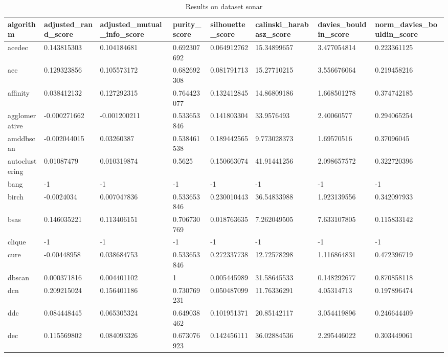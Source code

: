 \begin{table}[H]
\centering
\caption{Results on dataset sonar}
\label{S67_Table}
\begin{tabular}{|l|l|l|l|l|l|l|l|}
\hline
algorithm & adjusted\_rand\_score & adjusted\_mutual\_info\_score & purity\_score & silhouette\_score & calinski\_harabasz\_score & davies\_bouldin\_score & norm\_davies\_bouldin\_score \\
\hline
acedec & 0.143815303 & 0.104184681 & 0.692307692 & 0.064912762 & 15.34899657 & 3.477054814 & 0.223361125 \\
\hline
aec & 0.129323856 & 0.105573172 & 0.682692308 & 0.081791713 & 15.27710215 & 3.556676064 & 0.219458216 \\
\hline
affinity & 0.038412132 & 0.127292315 & 0.764423077 & 0.132412845 & 14.86809186 & 1.668501278 & 0.374742185 \\
\hline
agglomerative & -0.000271662 & -0.001200211 & 0.533653846 & 0.141803304 & 33.9576493 & 2.40060577 & 0.294065254 \\
\hline
amddbscan & -0.002044015 & 0.03260387 & 0.538461538 & 0.189442565 & 9.773028373 & 1.69570516 & 0.37096045 \\
\hline
autoclustering & 0.01087479 & 0.010319874 & 0.5625 & 0.150663074 & 41.91441256 & 2.098657572 & 0.322720396 \\
\hline
bang & -1 & -1 & -1 & -1 & -1 & -1 & -1 \\
\hline
birch & -0.0024034 & 0.007047836 & 0.533653846 & 0.230010443 & 36.54833988 & 1.923139556 & 0.342097933 \\
\hline
bsas & 0.146035221 & 0.113406151 & 0.706730769 & 0.018763635 & 7.262049505 & 7.633107805 & 0.115833142 \\
\hline
clique & -1 & -1 & -1 & -1 & -1 & -1 & -1 \\
\hline
cure & -0.00448958 & 0.038684753 & 0.533653846 & 0.272337738 & 12.72578298 & 1.116864831 & 0.472396719 \\
\hline
dbscan & 0.000371816 & 0.004401102 & 1 & 0.005445989 & 31.58645533 & 0.148292677 & 0.870858118 \\
\hline
dcn & 0.209215024 & 0.156401186 & 0.730769231 & 0.050487099 & 11.76336291 & 4.05314713 & 0.197896474 \\
\hline
ddc & 0.084448445 & 0.065305324 & 0.649038462 & 0.101951371 & 20.85142117 & 3.054419896 & 0.246644409 \\
\hline
dec & 0.115569802 & 0.084093326 & 0.673076923 & 0.142456111 & 36.02884536 & 2.295446022 & 0.303449061 \\

\end{tabular}
\end{table}
